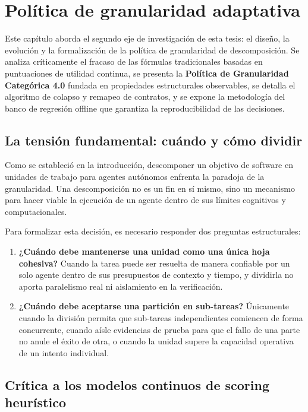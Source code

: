 \chapter{Política de granularidad adaptativa}
\label{cap:metodologia}

Este capítulo aborda el segundo eje de investigación de esta tesis: el diseño, la evolución y la formalización de la política de granularidad de descomposición. Se analiza críticamente el fracaso de las fórmulas tradicionales basadas en puntuaciones de utilidad continua, se presenta la \textbf{Política de Granularidad Categórica 4.0} fundada en propiedades estructurales observables, se detalla el algoritmo de colapso y remapeo de contratos, y se expone la metodología del banco de regresión offline que garantiza la reproducibilidad de las decisiones.

\section{La tensión fundamental: cuándo y cómo dividir}

Como se estableció en la introducción, descomponer un objetivo de software en unidades de trabajo para agentes autónomos enfrenta la paradoja de la granularidad. Una descomposición no es un fin en sí mismo, sino un mecanismo para hacer viable la ejecución de un agente dentro de sus límites cognitivos y computacionales.

Para formalizar esta decisión, es necesario responder dos preguntas estructurales:
\begin{enumerate}
  \item \textbf{¿Cuándo debe mantenerse una unidad como una única hoja cohesiva?} Cuando la tarea puede ser resuelta de manera confiable por un solo agente dentro de sus presupuestos de contexto y tiempo, y dividirla no aporta paralelismo real ni aislamiento en la verificación.
  \item \textbf{¿Cuándo debe aceptarse una partición en sub-tareas?} Únicamente cuando la división permita que sub-tareas independientes comiencen de forma concurrente, cuando aísle evidencias de prueba para que el fallo de una parte no anule el éxito de otra, o cuando la unidad supere la capacidad operativa de un intento individual.
\end{enumerate}

\section{Crítica a los modelos continuos de scoring heurístico}
\label{sec:critica-scoring}

